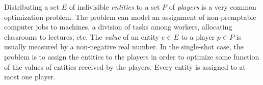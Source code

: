 \documentclass[11pt,a4paper]{article}
\begin{document}
Distributing a set $E$ of indivisible \emph{entities} to a set $P$ of \emph{players} is a very common optimization problem.  The problem can model an assignment of non-premptable computer jobs  to machines, a division of tasks among workers, allocating classrooms to lectures, etc.   The \emph{value} of an entity $e \in E$ to a player  $p \in P$ is usually measured by a non-negative real number.  In the single-shot case, the problem is to assign the entities to the players in order to optimize some function of the values of entities received by the players.  Every entity is assigned to at most one player.

\end{document}
